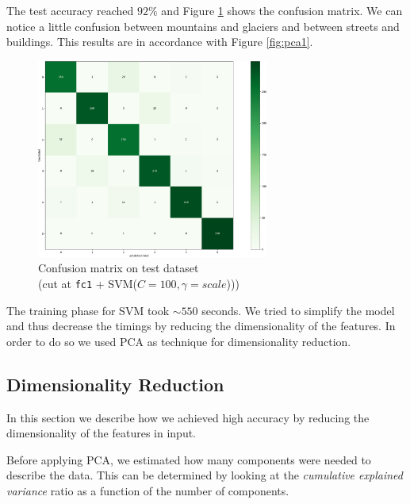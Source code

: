 \documentclass[compsoc]{IEEEtran}
\begin{document}
The test accuracy reached $92\%$ and Figure \ref{fig:cm1-test} shows the confusion matrix. We can notice a little confusion between mountains and glaciers and between streets and buildings. This results are in accordance with Figure \ref{fig:pca1}.


\begin{figure}[ht!]
\centering                                                                        
\includegraphics[width=3in]{../images/cm1-test.png}
\captionsetup{justification=centering}                                                                                         
\caption{Confusion matrix on test dataset \\ (cut at \texttt{fc1} + SVM($C=100, \gamma=scale$)))}
\label{fig:cm1-test}                                                                                                                               
\end{figure}

The training phase for SVM took ${\sim550}$ seconds. We tried to simplify the model and thus decrease the timings by reducing the dimensionality of the features. In order to do so we used PCA as technique for dimensionality reduction.


\subsection{Dimensionality Reduction}
In this section we describe how we achieved high accuracy by reducing the dimensionality of the features in input.\par
Before applying PCA, we estimated how many components were needed to describe the data. This can be determined by looking at the \emph{cumulative explained variance} ratio as a function of the number of components.
\end{document}
